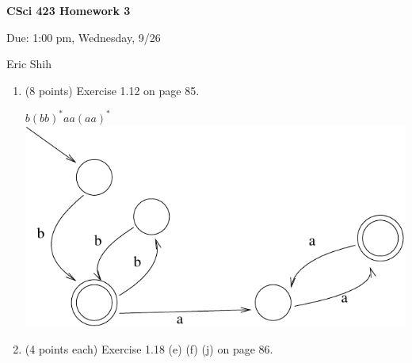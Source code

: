 \documentclass[11pt]{article}
\begin{document}
\begin{LARGE}
\centerline {\bf CSci 423 Homework 3}
\end{LARGE}
\vskip 0.25cm

\centerline{Due: 1:00 pm, Wednesday, 9/26}
\centerline{Eric Shih}

\begin{enumerate}
 \item (8 points) Exercise 1.12 on page 85.
  \begin{center}
    $b(bb)^* aa(aa)^*$ \\
    \includegraphics[scale=.4] {fig1.pdf}
  \end{center}

 \item (4 points each) Exercise 1.18 (e) (f) (j) on page 86.


\end{enumerate}
\end{document}

